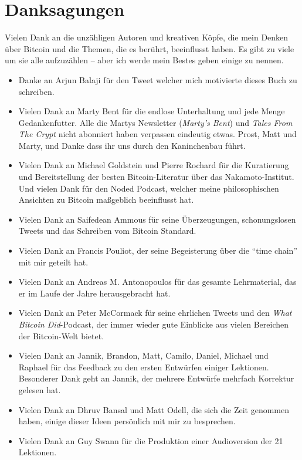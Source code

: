 \chapter*{Danksagungen}

Vielen Dank an die unzähligen Autoren und kreativen Köpfe, die mein Denken über
Bitcoin und die Themen, die es berührt, beeinflusst haben. Es gibt zu viele um
sie alle aufzuzählen -- aber ich werde mein Bestes geben einige zu nennen.

\begin{itemize}
  \item Danke an Arjun Balaji für den Tweet welcher mich motivierte dieses Buch zu schreiben.
  \item Vielen Dank an Marty Bent für die endlose Unterhaltung und jede Menge Gedankenfutter. Alle die Martys Newsletter (\textit{Marty's Bent}) und \textit{Tales From The Crypt} nicht abonniert haben verpassen eindeutig etwas. Prost, Matt und Marty, und Danke dass ihr uns durch den Kaninchenbau führt.
  \item Vielen Dank an Michael Goldstein und Pierre Rochard für die Kuratierung und Bereitstellung der besten Bitcoin-Literatur über das Nakamoto-Institut. Und vielen Dank für den Noded Podcast, welcher meine philosophischen Ansichten zu Bitcoin maßgeblich beeinflusst hat.
  \item Vielen Dank an Saifedean Ammous für seine Überzeugungen, schonungslosen Tweets und das Schreiben vom Bitcoin Standard.
  \item Vielen Dank an Francis Pouliot, der seine Begeisterung über die \enquote{time chain} mit mir geteilt hat.
  \item Vielen Dank an Andreas M. Antonopoulos für das gesamte Lehrmaterial, das er im Laufe der Jahre herausgebracht hat.
  \item Vielen Dank an Peter McCormack für seine ehrlichen Tweets und den \textit{What Bitcoin Did}-Podcast, der immer wieder gute Einblicke aus vielen Bereichen der Bitcoin-Welt bietet.
  \item Vielen Dank an Jannik, Brandon, Matt, Camilo, Daniel, Michael und Raphael für das Feedback zu den ersten Entwürfen einiger Lektionen. Besonderer Dank geht an Jannik, der mehrere Entwürfe mehrfach Korrektur gelesen hat.
  \item Vielen Dank an Dhruv Bansal und Matt Odell, die sich die Zeit genommen haben, einige dieser Ideen persönlich mit mir zu besprechen.
  \item Vielen Dank an Guy Swann für die Produktion einer Audioversion der 21 Lektionen.

\end{itemize}

